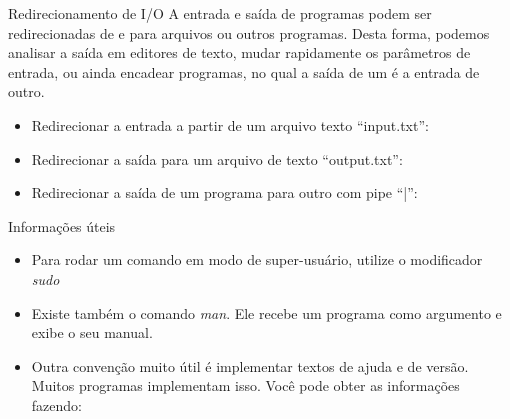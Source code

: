 \documentclass{beamer}
\begin{document}
\begin{frame}{Redirecionamento de I/O}
  A entrada e saída de programas podem ser redirecionadas de e para arquivos ou
  outros programas. Desta forma, podemos analisar a saída em editores de texto,
  mudar rapidamente os parâmetros de entrada, ou ainda encadear programas, no
  qual a saída de um é a entrada de outro.
  \begin{center}
    \begin{itemize}
    \item Redirecionar a entrada a partir de um arquivo texto ``input.txt'':
    \end{itemize}
    \begin{shell}
    \end{shell}

    \begin{itemize}
    \item Redirecionar a saída para um arquivo de texto ``output.txt'':
    \end{itemize}
    \begin{shell}
    \end{shell}

    \begin{itemize}
    \item Redirecionar a saída de um programa para outro com pipe ``|'':
    \end{itemize}
    \begin{shell}
    \end{shell}
    
  \end{center}

\end{frame}


\begin{frame}{Informações úteis}
  \begin{itemize}
  \item Para rodar um comando em modo de super-usuário, utilize o modificador
    \emph{sudo}
  \item Existe também o comando \emph{man}. Ele recebe um programa como
    argumento e exibe o seu manual.
  \item Outra convenção muito útil é implementar textos de ajuda e de versão.
    Muitos programas implementam isso. Você pode obter as informações fazendo:
  \end{itemize}
  \begin{center}
    \begin{shell}
    \end{shell}
  \end{center}
\end{frame}



\begin{frame}
  \begin{center}
    \begin{shell}
    \end{shell}
  \end{center}
\end{frame}
\end{document}
